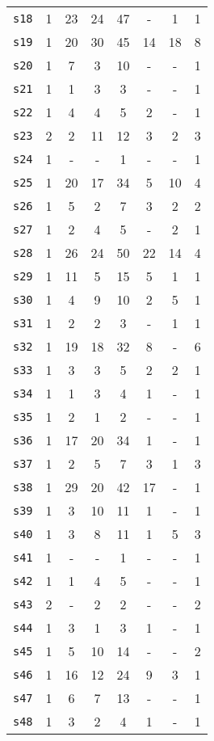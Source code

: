 \begin{longtable}{ l c c c c c c c }
\texttt{s18} & 1 & 23 & 24 & 47 & - & 1 & 1 \\
\texttt{s19} & 1 & 20 & 30 & 45 & 14 & 18 & 8 \\
\texttt{s20} & 1 & 7 & 3 & 10 & - & - & 1 \\
\texttt{s21} & 1 & 1 & 3 & 3 & - & - & 1 \\
\texttt{s22} & 1 & 4 & 4 & 5 & 2 & - & 1 \\
\texttt{s23} & 2 & 2 & 11 & 12 & 3 & 2 & 3 \\
\texttt{s24} & 1 & - & - & 1 & - & - & 1 \\
\texttt{s25} & 1 & 20 & 17 & 34 & 5 & 10 & 4 \\
\texttt{s26} & 1 & 5 & 2 & 7 & 3 & 2 & 2 \\
\texttt{s27} & 1 & 2 & 4 & 5 & - & 2 & 1 \\
\texttt{s28} & 1 & 26 & 24 & 50 & 22 & 14 & 4 \\
\texttt{s29} & 1 & 11 & 5 & 15 & 5 & 1 & 1 \\
\texttt{s30} & 1 & 4 & 9 & 10 & 2 & 5 & 1 \\
\texttt{s31} & 1 & 2 & 2 & 3 & - & 1 & 1 \\
\texttt{s32} & 1 & 19 & 18 & 32 & 8 & - & 6 \\
\texttt{s33} & 1 & 3 & 3 & 5 & 2 & 2 & 1 \\
\texttt{s34} & 1 & 1 & 3 & 4 & 1 & - & 1 \\
\texttt{s35} & 1 & 2 & 1 & 2 & - & - & 1 \\
\texttt{s36} & 1 & 17 & 20 & 34 & 1 & - & 1 \\
\texttt{s37} & 1 & 2 & 5 & 7 & 3 & 1 & 3 \\
\texttt{s38} & 1 & 29 & 20 & 42 & 17 & - & 1 \\
\texttt{s39} & 1 & 3 & 10 & 11 & 1 & - & 1 \\
\texttt{s40} & 1 & 3 & 8 & 11 & 1 & 5 & 3 \\
\texttt{s41} & 1 & - & - & 1 & - & - & 1 \\
\texttt{s42} & 1 & 1 & 4 & 5 & - & - & 1 \\
\texttt{s43} & 2 & - & 2 & 2 & - & - & 2 \\
\texttt{s44} & 1 & 3 & 1 & 3 & 1 & - & 1 \\
\texttt{s45} & 1 & 5 & 10 & 14 & - & - & 2 \\
\texttt{s46} & 1 & 16 & 12 & 24 & 9 & 3 & 1 \\
\texttt{s47} & 1 & 6 & 7 & 13 & - & - & 1 \\
\texttt{s48} & 1 & 3 & 2 & 4 & 1 & - & 1 \\

\end{longtable}
